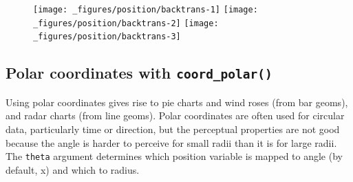 \begin{Shaded}
\begin{Highlighting}[]
\StringTok{ }\StringTok{ }
\StringTok{  }\NormalTok{() +}\StringTok{ }
\StringTok{  }\NormalTok{(} \NormalTok{) +}\StringTok{ }
\StringTok{  }\NormalTok{(}\NormalTok{) +}\StringTok{ }
\StringTok{  }\NormalTok{(}\NormalTok{) +}\StringTok{ }
\StringTok{  }\NormalTok{(} \NormalTok{)}

\StringTok{  }\NormalTok{() +}\StringTok{ }
\StringTok{  }\NormalTok{()}

\StringTok{ }\NormalTok{(}\NormalTok{)}
\StringTok{  }\NormalTok{() +}\StringTok{ }
\StringTok{  }\NormalTok{() +}\StringTok{ }
\StringTok{  }\NormalTok{(}  
\end{Highlighting}
\end{Shaded}

\begin{figure}[H]
  \texttt{[image: \_figures/position/backtrans-1]}%
  \texttt{[image: \_figures/position/backtrans-2]}%
  \texttt{[image: \_figures/position/backtrans-3]}
\end{figure}

\subsection{\texorpdfstring{Polar coordinates with
\texttt{coord\_polar()}}{Polar coordinates with coord\_polar()}}\label{polar-coordinates-with-coordux5fpolar}

Using polar coordinates gives rise to pie charts and wind roses (from
bar geoms), and radar charts (from line geoms). Polar coordinates are
often used for circular data, particularly time or direction, but the
perceptual properties are not good because the angle is harder to
perceive for small radii than it is for large radii. The \texttt{theta}
argument determines which position variable is mapped to angle (by
default, x) and which to radius.


